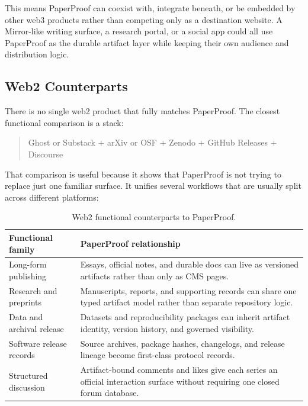 \documentclass[11pt]{article}
\begin{document}
This means PaperProof can coexist with, integrate beneath, or be embedded by
other web3 products rather than competing only as a destination website. A
Mirror-like writing surface, a research portal, or a social app could all use
PaperProof as the durable artifact layer while keeping their own audience and
distribution logic.

\subsection{Web2 Counterparts}

There is no single web2 product that fully matches PaperProof. The closest
functional comparison is a stack:

\begin{quote}
Ghost or Substack + arXiv or OSF + Zenodo + GitHub Releases + Discourse
\end{quote}

That comparison is useful because it shows that PaperProof is not trying to
replace just one familiar surface. It unifies several workflows that are
usually split across different platforms:

\begin{table}[htbp]
\centering
\caption{Web2 functional counterparts to PaperProof.}
\begin{tabularx}{\textwidth}{p{}X}
\toprule
\textbf{Functional family} & \textbf{PaperProof relationship} \\
\midrule
Long-form publishing & Essays, official notes, and durable docs can live as versioned artifacts rather than only as CMS pages. \\
Research and preprints & Manuscripts, reports, and supporting records can share one typed artifact model rather than separate repository logic. \\
Data and archival release & Datasets and reproducibility packages can inherit artifact identity, version history, and governed visibility. \\
Software release records & Source archives, package hashes, changelogs, and release lineage become first-class protocol records. \\
Structured discussion & Artifact-bound comments and likes give each series an official interaction surface without requiring one closed forum database. \\
\bottomrule
\end{tabularx}
\end{table}
\end{document}
